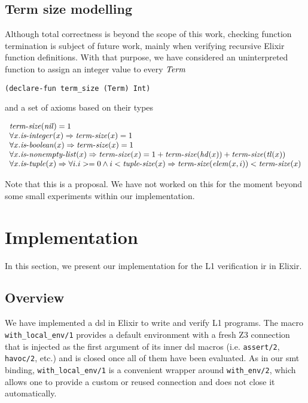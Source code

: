 \subsection{Term size modelling}
\label{sec:termsize}

Although total correctness is beyond the scope of this work, checking function
termination is subject of future work, mainly when verifying recursive Elixir
function definitions. With that purpose, we have considered an uninterpreted
function to assign an integer value to every $\mathit{Term}$

\begin{verbatim}
(declare-fun term_size (Term) Int)
\end{verbatim}

and a set of axioms based on their types

\[
\begin{array}{l}
\mathit{term\mbox{-}size}(\mathit{nil}) = 1\\
\forall x. \mathit{is\mbox{-}integer}(x) \Rightarrow \mathit{term\mbox{-}size}(x) = 1\\
\forall x. \mathit{is\mbox{-}boolean}(x) \Rightarrow \mathit{term\mbox{-}size}(x) = 1\\
\forall x. \mathit{is\mbox{-}nonempty\mbox{-}list}(x) \Rightarrow \mathit{term\mbox{-}size}(x) = 1 + \mathit{term\mbox{-}size}(\mathit{hd}(x)) + \mathit{term\mbox{-}size}(\mathit{tl}(x))\\
\forall x. \mathit{is\mbox{-}tuple}(x) \Rightarrow \forall i. i >= 0 \wedge i < \mathit{tuple\mbox{-}size}(x) \Rightarrow \mathit{term\mbox{-}size}(\mathit{elem}(x, i)) < \mathit{term\mbox{-}size}(x)\\
\end{array}
\]

Note that this is a proposal. We have not worked on this for the moment beyond
some small experiments within our implementation.

\section{Implementation}
\label{ir:l1implementation}

In this section, we present our implementation for the L1 verification \gls{ir}
in Elixir.

\subsection{Overview}
\label{ir:dslexample}

We have implemented a \gls{dsl} in Elixir to write and verify L1 programs. The
macro \verb|with_local_env/1| provides a default environment with a fresh Z3
connection that is injected as the first argument of its inner \gls{dsl} macros
(i.e. \verb|assert/2|, \verb|havoc/2|, etc.) and is closed once all of them have
been evaluated. As in our \acrshort{smt} binding, \verb|with_local_env/1| is a
convenient wrapper around \verb|with_env/2|, which allows one to provide a
custom or reused connection and does not close it automatically.

